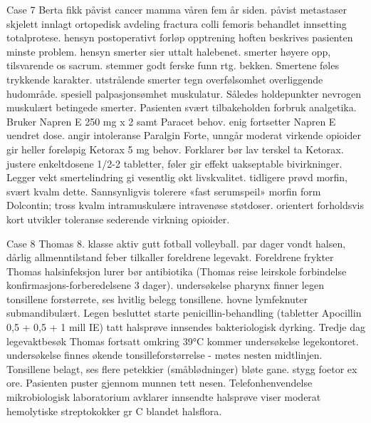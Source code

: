Case 7
Berta fikk påvist cancer mamma våren fem år siden.
påvist metastaser skjelett innlagt ortopedisk avdeling fractura colli femoris behandlet innsetting totalprotese.
hensyn postoperativt forløp opptrening hoften beskrives pasienten minste problem.
hensyn smerter sier uttalt halebenet.
smerter høyere opp, tilsvarende os sacrum.
stemmer godt ferske funn rtg.
bekken.
Smertene føles trykkende karakter.
utstrålende smerter tegn overfølsomhet overliggende hudområde.
spesiell palpasjonsømhet muskulatur.
Således holdepunkter nevrogen muskulært betingede smerter.
Pasienten svært tilbakeholden forbruk analgetika.
Bruker Napren E 250 mg x 2 samt Paracet behov.
enig fortsetter Napren E uendret dose.
angir intoleranse Paralgin Forte, unngår moderat virkende opioider gir heller foreløpig Ketorax 5 mg behov.
Forklarer bør lav terskel ta Ketorax.
justere enkeltdosene 1/2-2 tabletter, føler gir effekt uakseptable bivirkninger.
Legger vekt smertelindring gi vesentlig økt livskvalitet.
tidligere prøvd morfin, svært kvalm dette.
Sannsynligvis tolerere «fast serumspeil» morfin form Dolcontin; tross kvalm intramuskulære intravenøse støtdoser.
orientert forholdsvis kort utvikler toleranse sederende virkning opioider.

Case 8
Thomas 8.
klasse aktiv gutt fotball volleyball.
par dager vondt halsen, dårlig allmenntilstand feber tilkaller foreldrene legevakt.
Foreldrene frykter Thomas halsinfeksjon lurer bør antibiotika (Thomas reise leirskole forbindelse konfirmasjons-forberedelsene 3 dager).
undersøkelse pharynx finner legen tonsillene forstørrete, ses hvitlig belegg tonsillene.
hovne lymfeknuter submandibulært.
Legen besluttet starte penicillin-behandling (tabletter Apocillin 0,5 + 0,5 + 1 mill IE) tatt halsprøve innsendes bakteriologisk dyrking.
Tredje dag legevaktbesøk Thomas fortsatt omkring 39°C kommer undersøkelse legekontoret.
undersøkelse finnes økende tonsilleforstørrelse - møtes nesten midtlinjen.
Tonsillene belagt, ses flere petekkier (småblødninger) bløte gane.
stygg foetor ex ore.
Pasienten puster gjennom munnen tett nesen.
Telefonhenvendelse mikrobiologisk laboratorium avklarer innsendte halsprøve viser moderat hemolytiske streptokokker gr C blandet halsflora.

